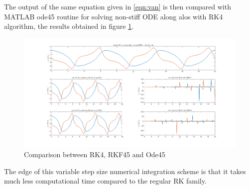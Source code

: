The output of the same equation given in \ref{eqn:van} is then compared with MATLAB ode45 routine for solving non-stiff ODE along alos with RK4 algorithm, the results obtained in figure \ref{fig:RK1_4}.

\begin{figure}[H]
    \centering
    \includegraphics[width = \textwidth]{Figures/Rk45.png}
    \caption{Comparison between RK4, RKF45 and Ode45}
    \label{fig:RK1_4}
\end{figure}
The edge of this variable step size numerical integration scheme is that it takes much less computational time compared to the regular RK family. 




\clearpage